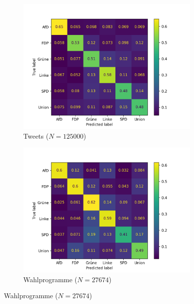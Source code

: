 \begin{figure}[H]
    \centering
    \begin{subfigure}{0.49\textwidth}
        \includegraphics[width=\textwidth]{data/images/modeling/baseline/tweets_confusion_matrix.png}
        \caption{Tweets (\(N=\num{125000}\))}
        \label{sfig:confusionMatrixBaselineTweets}
    \end{subfigure}
    \hfill
    \begin{subfigure}{0.49\textwidth}
        \includegraphics[width=\textwidth]{data/images/modeling/baseline/party_programs_confusion_matrix.png}
        \caption{Wahlprogramme (\(N=\num{27674}\))}
        \label{sfig:confusionMatrixBaselineManifest}
    \end{subfigure}

\end{figure}
